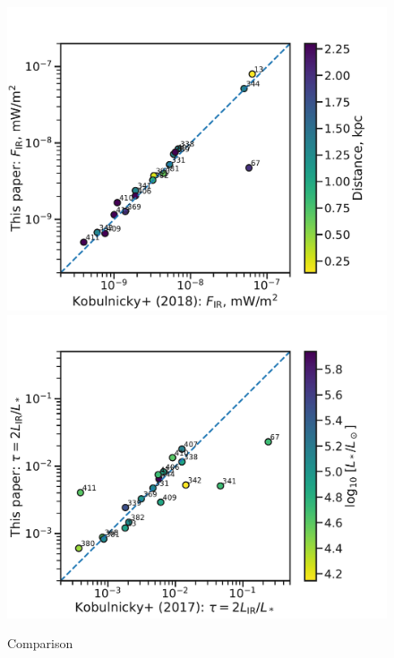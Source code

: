 \begin{figure}
  \centering
  \includegraphics[width=\linewidth]{figs/K18-flux-comparison}
  \includegraphics[width=\linewidth]{figs/K17-tau-comparison}
  \caption{Comparison}
  \label{fig:k17-k18-comparison}
\end{figure}




